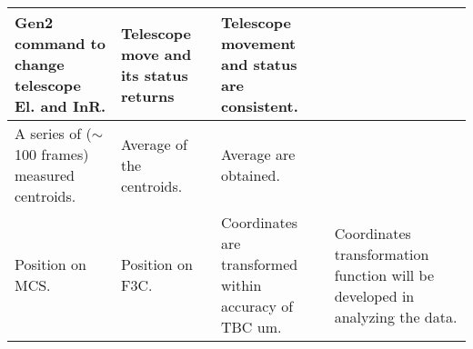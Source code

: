 \begin{longtable}{p{40mm}|p{40mm}|p{40mm}|p{35mm}}
Gen2 command to change telescope El. and InR.		&  Telescope move and its status returns	& Telescope movement and status are consistent. &  \\  \hline
 \rowcolor[rgb]{0.94, 0.97, 1.0}
A series of ($\sim$ 100 frames) measured centroids. 	&  Average of the centroids.	& Average are obtained. &  \\  \hline
Position on MCS.  	&  Position on F3C.	& Coordinates are transformed within accuracy of TBC um.  & Coordinates transformation function will be developed in analyzing the data. \\  \hline
\end{longtable}

